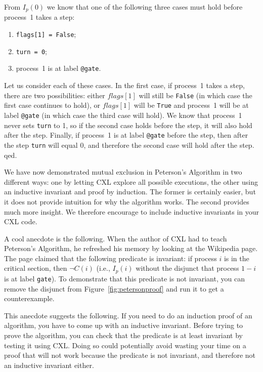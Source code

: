 \documentclass{report}
\begin{document}
From $I_p(0)$ we know that one of the following three cases must hold before
process~1 takes a step:
\begin{enumerate}
\item \texttt{flags[1] = False};
\item \texttt{turn = 0};
\item process~1 is at label \texttt{@gate}.
\end{enumerate}

Let us consider each of these cases.
In the first case, if process~1 takes a step, there are two possibilities:
either $flags[1]$ will still be \texttt{False} (in which case the first case
continues to hold), or $flags[1]$ will be \texttt{True}
and process~1 will be at label \texttt{@gate} (in which case the third case
will hold).
We know that process~1 never sets \texttt{turn} to 1, so
if the second case holds before the step, it will also hold after the step.
Finally, if process~1 is at label \texttt{@gate} before the step, then after
the step \texttt{turn} will equal 0, and therefore the second case will hold
after the step.  qed.

We have now demonstrated mutual exclusion in Peterson's Algorithm in two
different ways: one by letting CXL explore all possible executions, the
other using an inductive invariant and proof by induction.  The former
is certainly easier, but it does not provide intuition for why the
algorithm works.  The second provides much more insight.  We therefore
encourage to include inductive invariants in your CXL code.

A cool anecdote is the following.  When the author of CXL had to teach
Peterson's Algorithm, he refreshed his memory by looking at the Wikipedia
page.  The page claimed that the following predicate is invariant:
if process $i$ is in the critical section, then $\lnot C(i)$ (i.e.,
$I_p(i)$ without the disjunct that process $1-i$ is at label \texttt{gate}).
To demonstrate that this predicate is not invariant, you can remove the
disjunct from Figure~\ref{fig:petersonproof} and run it to get a
counterexample.

This anecdote suggests the following.  If you need to do an induction
proof of an algorithm, you have to come up with an inductive invariant.
Before trying to prove the algorithm, you can check that the predicate is
at least invariant by testing it using CXL.  Doing so could potentially
avoid wasting your time on a proof that will not work because the
predicate is not invariant, and therefore not an inductive invariant either.
\end{document}

